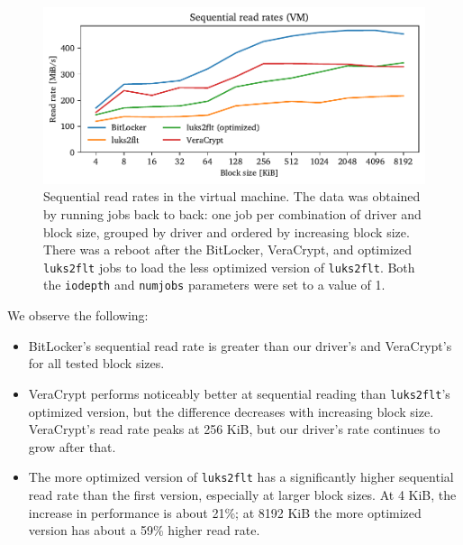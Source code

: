 \begin{figure}[htb!]
	\center
	\includegraphics[scale=1]{../fig/performance.vmexperiments.seq.pdf}
	\caption[
		Sequential read rates in the virtual machine
	]{
		Sequential read rates in the virtual machine. The data was obtained by running jobs back to back: one job per combination of driver and block size, grouped by driver and ordered by increasing block size. There was a reboot after the BitLocker, VeraCrypt, and optimized \texttt{luks2flt} jobs to load the less optimized version of \texttt{luks2flt}. Both the \texttt{iodepth} and \texttt{numjobs} parameters were set to a value of 1.
	}
	\label{fig:performance.vmexperiments.seq}
\end{figure}

We observe the following:
\begin{itemize}[beginpenalty=10000]
	\item BitLocker's sequential read rate is greater than our driver's and VeraCrypt's for all tested block sizes.
	\item VeraCrypt performs noticeably better at sequential reading than \texttt{luks2flt}'s optimized version, but the difference decreases with increasing block size. VeraCrypt's read rate peaks at 256 KiB, but our driver's rate continues to grow after that.
	\item The more optimized version of \texttt{luks2flt} has a significantly higher sequential read rate than the first version, especially at larger block sizes. At 4 KiB, the increase in performance is about 21\%; at 8192 KiB the more optimized version has about a 59\% higher read rate.
\end{itemize}

